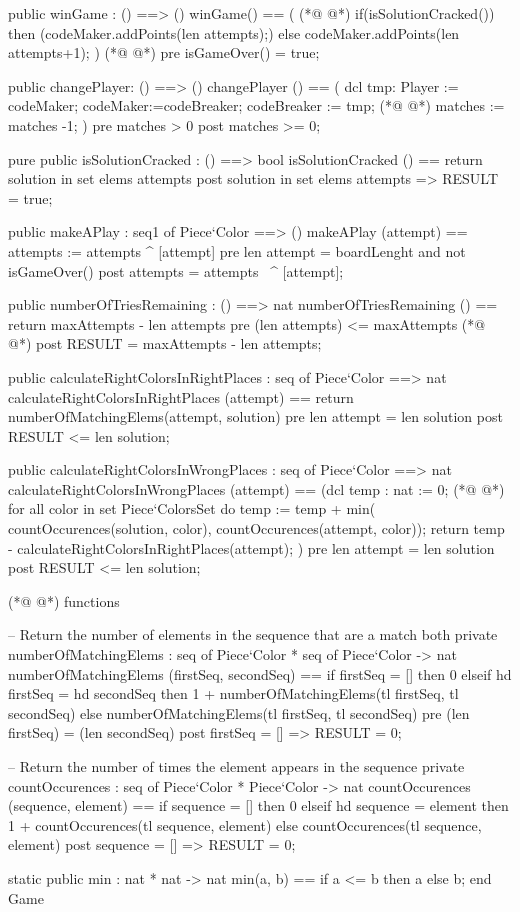 \begin{vdmpp}[breaklines=true]
  public winGame : () ==> ()
   winGame() == (
(*@
\label{numberOfTriesRemaining:70}
@*)
   if(isSolutionCracked()) then
   (codeMaker.addPoints(len attempts);)
   else
   codeMaker.addPoints(len attempts+1);
  )
(*@
\label{calculateRightColorsInRightPlaces:75}
@*)
  pre  isGameOver() = true;
  
  public changePlayer: () ==> ()
  changePlayer () == (
  dcl tmp:  Player := codeMaker;  
  codeMaker:=codeBreaker;
  codeBreaker := tmp;
(*@
\label{calculateRightColorsInWrongPlaces:82}
@*)
  matches := matches -1;
  )
  pre matches > 0
  post matches >= 0;
  
  
  pure public isSolutionCracked : () ==> bool
   isSolutionCracked () == return solution in set elems attempts
  post solution in set elems attempts => RESULT = true;  
    
  public makeAPlay : seq1 of Piece`Color ==> ()
   makeAPlay (attempt) == attempts := attempts ^ [attempt]
  pre len attempt = boardLenght and not isGameOver()
  post attempts = attempts~ ^ [attempt];    
  
  public numberOfTriesRemaining : () ==> nat
   numberOfTriesRemaining () == return maxAttempts - len attempts
  pre (len attempts) <= maxAttempts
(*@
\label{numberOfMatchingElems:100}
@*)
  post RESULT = maxAttempts - len attempts;
  
  public calculateRightColorsInRightPlaces : seq of Piece`Color ==> nat
   calculateRightColorsInRightPlaces (attempt) ==
    return numberOfMatchingElems(attempt, solution)
  pre len attempt = len solution
  post RESULT <= len solution;
   
   
  public calculateRightColorsInWrongPlaces : seq of Piece`Color ==> nat
   calculateRightColorsInWrongPlaces (attempt) == 
    (dcl temp : nat := 0;
(*@
\label{countOccurences:112}
@*)
     for all color in set Piece`ColorsSet do
      temp := temp +
       min(
        countOccurences(solution, color),
        countOccurences(attempt, color));
     return temp - calculateRightColorsInRightPlaces(attempt);
    )
  pre len attempt = len solution
  post RESULT <= len solution;

(*@
\label{min:122}
@*)
functions

  -- Return the number of elements in the sequence that are a match both
private numberOfMatchingElems : seq of Piece`Color * seq of Piece`Color -> nat
   numberOfMatchingElems (firstSeq, secondSeq) ==
    if firstSeq = [] then
     0
    elseif hd firstSeq = hd secondSeq then
     1 + numberOfMatchingElems(tl firstSeq, tl secondSeq)
    else
     numberOfMatchingElems(tl firstSeq, tl secondSeq)
   pre (len firstSeq) = (len secondSeq)
   post firstSeq = [] => RESULT = 0;

-- Return the number of times the element appears in the sequence
  private countOccurences : seq of Piece`Color * Piece`Color -> nat
   countOccurences (sequence, element) ==
    if sequence = [] then
     0
    elseif hd sequence = element then
     1 + countOccurences(tl sequence, element)
    else
     countOccurences(tl sequence, element)
   post sequence = [] => RESULT = 0;
   
   static public min : nat * nat -> nat
   min(a, b) ==
    if a <= b then a
    else b;
end Game
\end{vdmpp}
